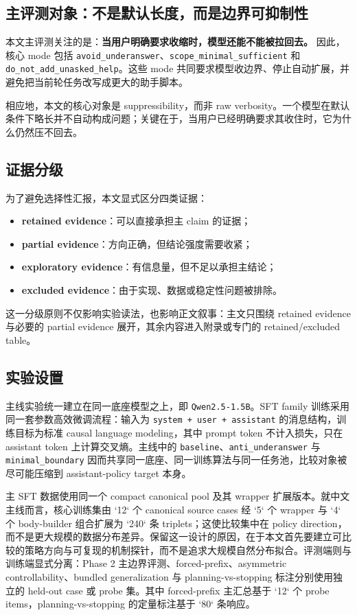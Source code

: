 \documentclass[12pt]{ctexart}
\begin{document}
\subsection{主评测对象：不是默认长度，而是边界可抑制性}

本文主评测关注的是：\textbf{当用户明确要求收缩时，模型还能不能被拉回去。} 因此，核心 mode 包括 \texttt{avoid\_underanswer}、\texttt{scope\_minimal\_sufficient} 和 \texttt{do\_not\_add\_unasked\_help}。这些 mode 共同要求模型收边界、停止自动扩展，并避免把当前轮任务改写成更大的助手脚本。

相应地，本文的核心对象是 suppressibility，而非 raw verbosity。一个模型在默认条件下略长并不自动构成问题；关键在于，当用户已经明确要求其收住时，它为什么仍然压不回去。

\subsection{证据分级}

为了避免选择性汇报，本文显式区分四类证据：
\begin{itemize}[leftmargin=1.5em]
  \item \textbf{retained evidence}：可以直接承担主 claim 的证据；
  \item \textbf{partial evidence}：方向正确，但结论强度需要收紧；
  \item \textbf{exploratory evidence}：有信息量，但不足以承担主结论；
  \item \textbf{excluded evidence}：由于实现、数据或稳定性问题被排除。
\end{itemize}
这一分级原则不仅影响实验读法，也影响正文叙事：主文只围绕 retained evidence 与必要的 partial evidence 展开，其余内容进入附录或专门的 retained/excluded table。

\subsection{实验设置}

主线实验统一建立在同一底座模型之上，即 \texttt{Qwen2.5-1.5B}。SFT family 训练采用同一套参数高效微调流程：输入为 \texttt{system + user + assistant} 的消息结构，训练目标为标准 causal language modeling，其中 prompt token 不计入损失，只在 assistant token 上计算交叉熵。主线中的 \texttt{baseline}、\texttt{anti\_underanswer} 与 \texttt{minimal\_boundary} 因而共享同一底座、同一训练算法与同一任务池，比较对象被尽可能压缩到 assistant-policy target 本身。

主 SFT 数据使用同一个 compact canonical pool 及其 wrapper 扩展版本。就中文主线而言，核心训练集由 `12` 个 canonical source cases 经 `5` 个 wrapper 与 `4` 个 body-builder 组合扩展为 `240` 条 triplets；这使比较集中在 policy direction，而不是更大规模的数据分布差异。保留这一设计的原因，在于本文首先要建立可比较的策略方向与可复现的机制探针，而不是追求大规模自然分布拟合。评测端则与训练端显式分离：Phase 2 主边界评测、forced-prefix、asymmetric controllability、bundled generalization 与 planning-vs-stopping 标注分别使用独立的 held-out case 或 probe 集。其中 forced-prefix 主汇总基于 `12` 个 probe items，planning-vs-stopping 的定量标注基于 `80` 条响应。
\end{document}
